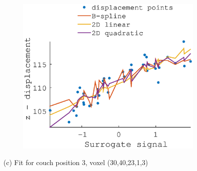 \documentclass[11pt,a4paper,oneside]{report}
\begin{document}
\begin{figure}
\begin{subfigure}[b]{0.33\textwidth}
  \end{subfigure}
    ~ %
  \begin{subfigure}[b]{0.33\textwidth}
    \includegraphics[width=\textwidth, trim=0 0 0 110,clip=true]{figures/task2/fit_round3_couch3.eps}
  \end{subfigure}
  (c) Fit for couch position 3, voxel (30,40,23,1,3)
  \vspace*{1em}
  

\end{figure}
\end{document}

